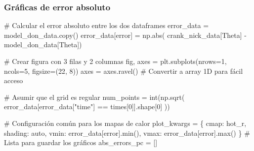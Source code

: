 \documentclass[
  spanish,
  us-letterpaper,
]{scrreprt}
\newenvironment{Shaded}{\begin{snugshade}}{\end{snugshade}}
\newcommand{\BuiltInTok}[1]{\textcolor[rgb]{0.00,0.23,0.31}{#1}}
\newcommand{\CommentTok}[1]{\textcolor[rgb]{0.37,0.37,0.37}{#1}}
\newcommand{\DecValTok}[1]{\textcolor[rgb]{0.68,0.00,0.00}{#1}}
\newcommand{\NormalTok}[1]{\textcolor[rgb]{0.00,0.23,0.31}{#1}}
\newcommand{\OperatorTok}[1]{\textcolor[rgb]{0.37,0.37,0.37}{#1}}
\newcommand{\StringTok}[1]{\textcolor[rgb]{0.13,0.47,0.30}{#1}}
\theoremstyle{definition}
\theoremstyle{plain}
\theoremstyle{remark}
\begin{document}
\subsubsection{Gráficas de error
absoluto}\label{gruxe1ficas-de-error-absoluto}

\begin{Shaded}
\begin{Highlighting}[]
\CommentTok{\# Calcular el error absoluto entre los dos dataframes}
\NormalTok{error\_data }\OperatorTok{=}\NormalTok{ model\_don\_data.copy()}
\NormalTok{error\_data[}\StringTok{\textquotesingle{}error\textquotesingle{}}\NormalTok{] }\OperatorTok{=}\NormalTok{ np.}\BuiltInTok{abs}\NormalTok{(}
\NormalTok{                    crank\_nick\_data[}\StringTok{\textquotesingle{}Theta\textquotesingle{}}\NormalTok{] }\OperatorTok{{-}}\NormalTok{ model\_don\_data[}\StringTok{\textquotesingle{}Theta\textquotesingle{}}\NormalTok{])}

\CommentTok{\# Crear figura con 3 filas y 2 columnas}
\NormalTok{fig, axes }\OperatorTok{=}\NormalTok{ plt.subplots(nrows}\OperatorTok{=}\DecValTok{1}\NormalTok{, ncols}\OperatorTok{=}\DecValTok{5}\NormalTok{, figsize}\OperatorTok{=}\NormalTok{(}\DecValTok{22}\NormalTok{, }\DecValTok{8}\NormalTok{))}
\NormalTok{axes }\OperatorTok{=}\NormalTok{ axes.ravel()  }\CommentTok{\# Convertir a array 1D para fácil acceso}

\CommentTok{\# Asumir que el grid es regular}
\NormalTok{num\_points }\OperatorTok{=} \BuiltInTok{int}\NormalTok{(np.sqrt(}
\NormalTok{                    error\_data[error\_data[}\StringTok{"time"}\NormalTok{] }\OperatorTok{==}\NormalTok{ times[}\DecValTok{0}\NormalTok{]].shape[}\DecValTok{0}\NormalTok{]}
\NormalTok{                    ))}

\CommentTok{\# Configuración común para los mapas de calor}
\NormalTok{plot\_kwargs }\OperatorTok{=}\NormalTok{ \{}
    \StringTok{\textquotesingle{}cmap\textquotesingle{}}\NormalTok{: }\StringTok{\textquotesingle{}hot\_r\textquotesingle{}}\NormalTok{,}
    \StringTok{\textquotesingle{}shading\textquotesingle{}}\NormalTok{: }\StringTok{\textquotesingle{}auto\textquotesingle{}}\NormalTok{,}
    \StringTok{\textquotesingle{}vmin\textquotesingle{}}\NormalTok{: error\_data[}\StringTok{\textquotesingle{}error\textquotesingle{}}\NormalTok{].}\BuiltInTok{min}\NormalTok{(),}
    \StringTok{\textquotesingle{}vmax\textquotesingle{}}\NormalTok{: error\_data[}\StringTok{\textquotesingle{}error\textquotesingle{}}\NormalTok{].}\BuiltInTok{max}\NormalTok{()}
\NormalTok{\}}
\CommentTok{\# Lista para guardar los gráficos}
\NormalTok{abs\_errors\_pc }\OperatorTok{=}\NormalTok{ []}


\end{Highlighting}
\end{Shaded}
\end{document}
